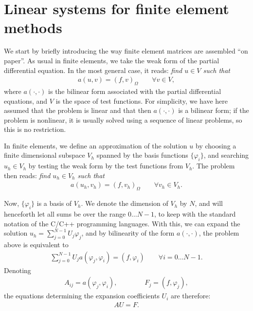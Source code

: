 \documentclass{article}
\begin{document}
\section{Linear systems for finite element methods}

We start by briefly introducing the way finite element matrices are assembled
``on paper''. As usual in finite elements, we take the weak form of the partial
differential equation. In the most general case, it reads: \textit{find $u\in
  V$ such that}
\begin{gather*}
  a(u, v) = (f,v)_\Omega \qquad \forall v\in V,
\end{gather*}
where $a(\cdot,\cdot)$ is the bilinear form associated with the partial
differential equations, and $V$ is the space of test functions. For
simplicity, we have here assumed that the problem is linear and that then
$a(\cdot,\cdot)$ is a bilinear form; if the problem is nonlinear, it is
usually solved using a sequence of linear problems, so this is no restriction.

In finite elements, we define an approximation of the solution $u$ by choosing
a finite dimensional subspace $V_h$ spanned by the basis functions
$\{\varphi_i\}$, and searching $u_h\in V_h$ by testing the weak form by the
test functions from $V_h$. The problem then reads: \textit{find $u_h\in V_h$
such that}
\begin{gather*}
  a(u_h, v_h) = (f,v_h)_\Omega \qquad \forall v_h\in V_h.
\end{gather*}

Now, $\{\varphi_i\}$ is a basis of $V_h$. We denote the dimension of $V_h$ by
$N$, and will henceforth let all sums be over the range $0\ldots N-1$, to keep
with the standard notation of the C/C++ programming languages. With this, we
can expand the solution $u_h=\sum_{j=0}^{N-1} U_j \varphi_j$, and by
bilinearity of the form $a(\cdot,\cdot)$, the problem above is equivalent to
\begin{gather}
  \label{eq:lin-1}
  \sum_{j=0}^{N-1} U_j a(\varphi_j,\varphi_i) = (f, \varphi_i)
  \qquad
  \forall i=0\ldots N-1.
\end{gather}
Denoting
\begin{gather*}
  A_{ij} = a(\varphi_j,\varphi_i),
  \qquad
  \qquad
  F_j = (f, \varphi_j),
\end{gather*}
the equations determining the expansion coefficients $U_i$ are therefore:
\begin{gather}
  \label{eq:lin-2}
  A U = F.
\end{gather}
\end{document}
